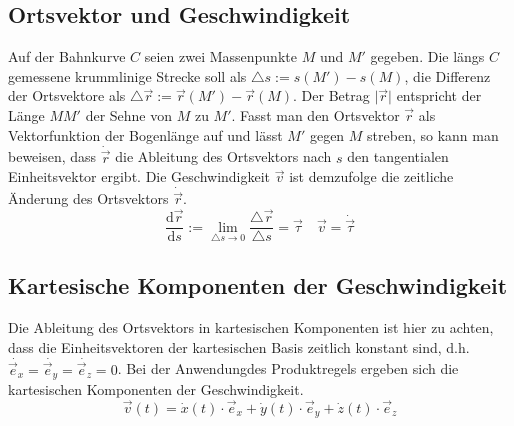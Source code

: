 \subsection{Ortsvektor und Geschwindigkeit}
Auf der Bahnkurve $C$ seien zwei Massenpunkte $M$ und $M'$ gegeben. Die längs $C$ gemessene krummlinige Strecke soll als $\triangle s:=s\left(M'\right)-s\left(M\right)$, die Differenz der Ortsvektore als $\triangle \overrightarrow{r}:=\overrightarrow{r}\left(M'\right)-\overrightarrow{r}\left(M\right)$. Der Betrag $\Big\vert\overrightarrow{r}\Big\vert$ entspricht der Länge $MM'$ der Sehne von $M$ zu $M'$. Fasst man den Ortsvektor $\overrightarrow{r}$ als Vektorfunktion der Bogenlänge auf und lässt $M'$ gegen $M$ streben, so kann man beweisen, dass $\dot{\overrightarrow{r}}$ die Ableitung des Ortsvektors nach $s$ den tangentialen Einheitsvektor ergibt. Die Geschwindigkeit $\overrightarrow{v}$ ist demzufolge die zeitliche Änderung des Ortsvektors $\dot{\overrightarrow{r}}$.
\begin{equation}
\boxed{\dfrac{\text{d}\overrightarrow{r}}{\text{d}s}:=\displaystyle \lim_{\triangle s\rightarrow 0}\dfrac{\triangle \overrightarrow{r}}{\triangle s}=\overrightarrow{\tau}}\quad \boxed{\overrightarrow{v}=\dot{\overrightarrow{\tau}}}
\end{equation}
\subsection{Kartesische Komponenten der Geschwindigkeit}
Die Ableitung des Ortsvektors in kartesischen Komponenten ist hier zu achten, dass die Einheitsvektoren der kartesischen Basis zeitlich konstant sind, d.h. $\dot{\overrightarrow{e}_x}=\dot{\overrightarrow{e}_y}=\dot{\overrightarrow{e}_z}=0$. Bei der Anwendungdes Produktregels ergeben sich die kartesischen Komponenten der Geschwindigkeit.
\begin{equation}
\boxed{\overrightarrow{v}\left(t\right)=\dot{x}\left(t\right)\cdot \overrightarrow{e}_x+\dot{y}\left(t\right)\cdot \overrightarrow{e}_y+\dot{z}\left(t\right)\cdot \overrightarrow{e}_z}
\end{equation}
